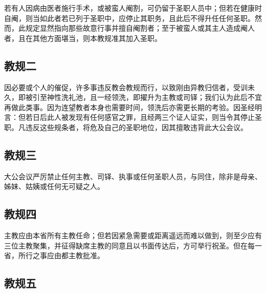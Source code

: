 若有人因病由医者施行手术，或被蛮人阉割，可仍留于圣职人员中；但若在健康时自阉，则当如此者若已列于圣职中，应停止其职务，且此后不得升任任何圣职。然而，此规定显然指向那些故意行事并擅自阉割者；至于被蛮人或其主人造成阉人者，且在其他方面堪当，则本教规准其加入圣职。\par


\subsection{教规二}

因必要或个人的催促，许多事违反教会教规而行，以致刚由异教归信者，受训未久，即被引至神性洗礼池，且一经领洗，即擢升为主教或司铎；我们认为此后不宜再做此类事。因为连望教者本身也需要时间，领洗后亦需更长期的考验。因圣经明言：但若日后此人被发现有任何感官之罪，且经两三个证人证实，则当令其停止圣职。凡违反这些规条者，将危及自己的圣职地位，因其擅敢违背此大公会议。\par


\subsection{教规三}

大公会议严厉禁止任何主教、司铎、执事或任何圣职人员，与同住，除非是母亲、姊妹、姑姨或任何无可疑之人。\par


\subsection{教规四}

主教应由本省所有主教任命；但若因紧急需要或距离遥远而难以做到，则至少应有三位主教聚集，并征得缺席主教的同意且以书面传达后，方可举行祝圣。但在每一省，所行之事应由都主教批准。\par


\subsection{教规五}

